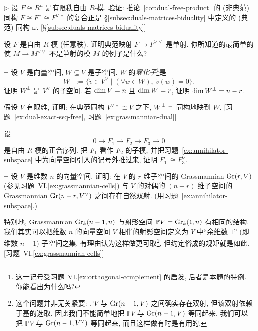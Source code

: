 \begin{prob}\label{ex:double-dual-free}
$\triangleright$ 设 $F\cong R^n$ 是有限秩自由 $R$-模. 验证: 推论~\ref{cor:dual-free-product} 的 (非典范) 同构 $F\cong F^\vee\cong F^{\vee\vee}$ 的复合正是 \S\ref{subsec:duals-matrices-biduality} 中定义的 (典范) 同构 $\omega$. [\S\ref{subsec:duals-matrices-biduality}]
\end{prob}

\begin{prob}\label{ex:free-into-double-dual}
设 $F$ 是自由 $R$-模 (任意秩). 证明典范映射 $F\to F^{\vee\vee}$ 是单射. 你所知道的最简单的使 $M\to M^{\vee\vee}$ 不是单射的模 $M$ 的例子是什么?
\end{prob}

\begin{prob}\label{ex:annihilator-subspace}
$\neg$ 设 $V$ 是向量空间, $W\subseteq V$ 是子空间. $W$ 的\emph{零化子}\footnote{这一记号受习题~VI.\ref{ex:orthogonal-complement} 的启发, 后者是本题的特例. 你能看出为什么吗?}是
\[
W^\perp:=\{\check{v}\in V^\vee\mid(\forall w\in W),\ \check{v}(w)=0\}.
\]
证明 $W^\perp$ 是 $V^\vee$ 的子空间. 若 $\operatorname{dim} V=n$ 且 $\operatorname{dim} W=r$, 证明 $\operatorname{dim} W^\perp=n-r$.

假设 $V$ 有限维, 证明: 在典范同构 $V^{\vee\vee}\cong V$ 之下, $W^{\perp\perp}$ 同构地映到 $W$. [习题~\ref{ex:dual-exact-seq-free}, 习题~\ref{ex:grassmannian-dual}]
\end{prob}

\begin{prob}\label{ex:dual-exact-seq-free}
设
\[
0\longrightarrow F_1\longrightarrow F_2\longrightarrow F_3\longrightarrow 0
\]
是自由 $R$-模的正合序列. 把 $F_1$ 看作 $F_2$ 的子模, 并把习题~\ref{ex:annihilator-subspace} 中为向量空间引入的记号外推过来, 证明 $F_1^\perp\cong F_3^\vee$.
\end{prob}

\begin{prob}\label{ex:grassmannian-dual}
$\neg$ 设 $V$ 是维数 $n$ 的向量空间. 证明: 在 $V$ 的 $r$ 维子空间的 Grassmannian $\operatorname{Gr}(r,V)$ (参见习题~VI.\ref{ex:grassmannian-cells}) 与 $V$ 的对偶的 $(n-r)$ 维子空间的 Grassmannian $\operatorname{Gr}(n-r,V^\vee)$ 之间存在自然双射. (用习题~\ref{ex:annihilator-subspace}.)

特别地, Grassmannian $\operatorname{Gr}_k(n-1,n)$ 与射影空间 $\mathbb{P}V=\operatorname{Gr}_k(1,n)$ 有相同的结构. 我们其实可以把维数 $n$ 的向量空间 $V$ 相伴的射影空间定义为 $V$ 中``余维数 $1$'' (即维数 $n-1$) 子空间之集. 有理由认为这样做更可取\footnote{这个问题并非无关紧要: $\mathbb{P}V$ 与 $\operatorname{Gr}(n-1,V)$ 之间确实存在双射, 但该双射依赖于基的选取. 因此我们不能简单地把 $\mathbb{P}V$ 与 $\operatorname{Gr}(n-1,V)$ 等同起来. 我们可以把 $\mathbb{P}V$ 与 $\operatorname{Gr}(n-1,V^\vee)$ 等同起来, 而且这样做有时是有用的.}, 但约定俗成的规矩就是如此. [习题~VI.\ref{ex:grassmannian-cells}]
\end{prob}

